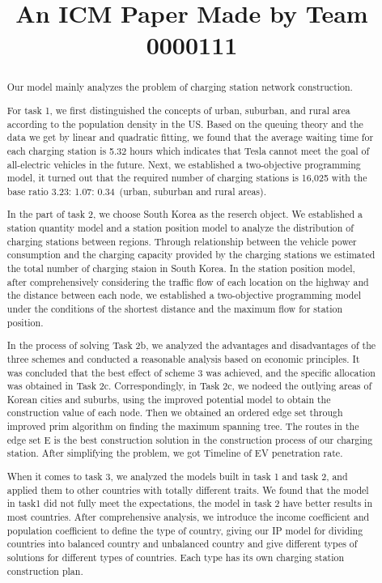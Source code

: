 \documentclass[12pt]{article}  %
\title{An ICM Paper Made by Team 0000111}  %
\begin{document}
\begin{abstract}
Our model mainly analyzes the problem of charging station network construction.
	
For task 1, we first distinguished the concepts of urban, suburban, and rural area according to the population density in the US. Based on the queuing theory and the data we get by linear and quadratic fitting, we found that the average waiting time for each charging station is 5.32 hours which indicates that Tesla cannot meet the goal of all-electric vehicles in the future. Next, we established a two-objective programming model, it turned out that the required number of charging stations is 16,025 with the base ratio 3.23: 1.07: 0.34\ (urban, suburban and rural areas). 

In the part of task 2, we choose South Korea as the reserch object. We established a station quantity model and a station position model to analyze the distribution of charging stations between regions. Through relationship between the vehicle power consumption and the charging capacity provided by the charging stations we estimated the total number of charging staion in South Korea. In the station position model, after comprehensively considering the traffic flow of each location on the highway and the distance between each node, we established a two-objective programming model under the conditions of the shortest distance and the maximum flow for station position.

In the process of solving Task 2b, we analyzed the advantages and disadvantages of the three schemes and conducted a reasonable analysis based on economic principles. It was concluded that the best effect of scheme 3 was achieved, and the specific allocation was obtained in Task 2c. Correspondingly, in Task 2c, we nodeed the outlying areas of Korean cities and suburbs, using the improved potential model to obtain the construction value of each node. Then we obtained an ordered edge set through improved prim algorithm on finding the maximum spanning tree.  
The routes in the edge set E is the best construction solution in the construction process of our charging station. After simplifying the problem, we got Timeline of EV penetration rate.

When it comes to task 3, we analyzed the models built in task 1 and task 2, and applied them to other countries with totally different traits. We found that the model in task1 did not fully meet the expectations, the model in task 2 have better results in most countries. After comprehensive analysis, we introduce the income coefficient and population coefficient to define the type of country, giving our IP model for dividing countries into balanced country and unbalanced country and give different types of solutions for different types of countries. Each type has its own charging station construction plan.


\end{abstract}
\end{document}
